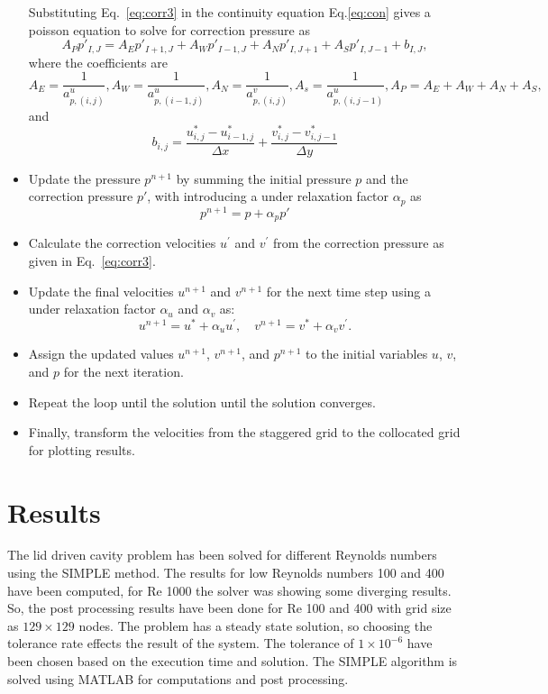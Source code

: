 \documentclass{article}
\numberwithin{equation}{section}
\numberwithin{figure}{section}
\begin{document}
\begin{itemize}
    Substituting Eq.~\ref{eq:corr3} in the continuity equation Eq.\ref{eq:con} gives a poisson equation to solve for correction pressure as
    \begin{equation}
        A_P p'_{I,J} = A_E p'_{I+1,J} +A_W p'_{I-1,J} + A_N p'_{I,J+1} +A_S p'_{I,J-1} + b_{I,J},
    \end{equation}
    where the coefficients are
    \begin{equation}
        A_E = \frac{1}{a_{p,(i,j)}^u},  A_W = \frac{1}{a_{p,(i-1,j)}^u},  A_N = \frac{1}{a_{p,(i,j)}^v},  A_s = \frac{1}{a_{p,(i,j-1)}^u}, A_P= A_E + A_W+A_N+A_S,
    \end{equation}
    and 
    \begin{equation}
        b_{i,j} = \frac{u^\ast_{i,j}-u^\ast_{i-1,j}}{\Delta x}+\frac{v^\ast_{i,j}-v^\ast_{i,j-1}}{\Delta y}
    \end{equation}
    
 
    \item Update the pressure \( p^{n+1} \) by summing the initial pressure \( p \) and the correction pressure \( p' \), with introducing a under relaxation factor $\alpha_p$ as
    \begin{equation}
        p^{n+1} = p + \alpha_pp'
    \end{equation}
    \item Calculate the correction velocities \( u^\prime \) and \( v^\prime \) from the correction pressure as given in Eq.~\ref{eq:corr3}. 
    \item Update the final velocities \( u^{n+1} \) and \( v^{n+1} \) for the next time step using a under relaxation factor $\alpha_u$ and $\alpha_v$ as:
    \[
    u^{n+1} = u^\ast + \alpha_uu^\prime, \quad v^{n+1} = v^\ast + \alpha_v v^\prime.
    \]
    \item Assign the updated values \( u^{n+1} \), \( v^{n+1} \), and \( p^{n+1} \) to the initial variables \( u \), \( v \), and \( p \) for the next iteration.
    \item Repeat the loop until the solution until the solution converges.
    \item Finally, transform the velocities from the staggered grid to the collocated grid for plotting results.
\end{itemize}

\section{Results}
The lid driven cavity problem has been solved for different Reynolds numbers using the SIMPLE method. The results for low Reynolds numbers 100 and 400 have been computed, for Re 1000 the solver was showing some diverging results. So, the post processing results have been done for Re 100 and 400 with grid size as $129\times129$ nodes.
The problem has a steady state solution, so choosing the tolerance rate effects the result of the system. The tolerance of $1\times 10^{-6}$ have been chosen based on the execution time and solution. The SIMPLE algorithm is solved using MATLAB for computations and post processing. 
\end{document}
